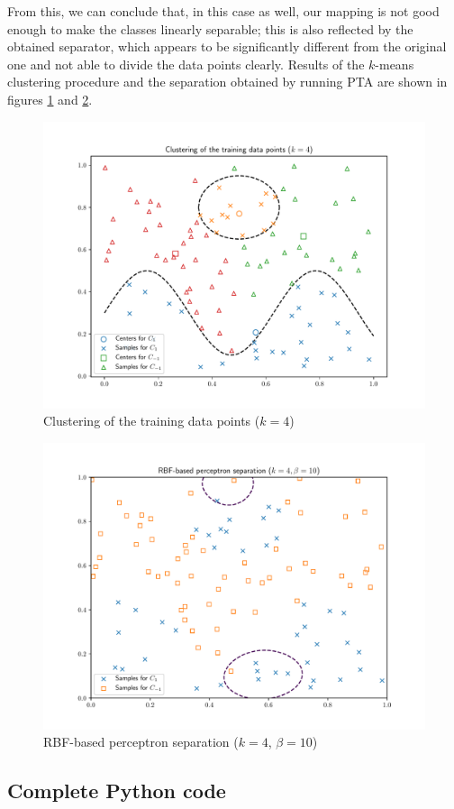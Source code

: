 \documentclass[letterpaper,headings=standardclasses]{scrartcl}
\begin{document}
From this, we can conclude that, in this case as well, our mapping is not good enough to make the classes linearly separable; this is also reflected by the obtained separator, which appears to be significantly different from the original one and not able to divide the data points clearly. Results of the $k$-means clustering procedure and the separation obtained by running PTA are shown in figures \ref{data_4} and \ref{sep_4_10}.

\begin{figure}[h]
    \centering
    \includegraphics[width=0.7\linewidth]{data_4.pdf}
    \caption{Clustering of the training data points ($k = 4$)}
    \label{data_4}
\end{figure}

\begin{figure}[h]
    \centering
    \includegraphics[width=0.7\linewidth]{sep_4_10.pdf}
    \caption{RBF-based perceptron separation ($k = 4$, $\beta = 10$)}
    \label{sep_4_10}
\end{figure}

\subsection{Complete Python code}


\end{document}
